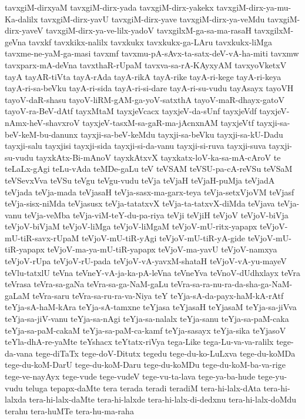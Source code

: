 {tavxgiM-dirxyaM
tavxgiM-dirx-yada
tavxgiM-dirx-yakekx
tavxgiM-dirx-ya-mu-Ka-dalilx
tavxgiM-dirx-yavU
tavxgiM-dirx-yave
tavxgiM-dirx-ya-veMdu
tavxgiM-dirx-yaveV
tavxgiM-dirx-ya-ve-lilx-yadoV
tavxgilxM-ga-sa-ma-rasaH
tavxgilxM-geVna
tavxkf
tavxkikx-nalilx
tavxkukx
tavxkukx-ga-LAru
tavxkukx-liMga
tavxme-ne-yaM-ga-masi
tavxmf
tavxmu-pA-sAvx-ta-satx-deV-vA-ha-miti
tavxmw
tavxparx-mA-deVna
tavxthaR-rUpaM
tavxva-sa-rA-KAyxyAM
tavxyoVketxV
tayA
tayAR-tiVta
tayA-rAda
tayA-rikA
tayA-rike
tayA-ri-kege
tayA-ri-keya
tayA-ri-sa-beVku
tayA-ri-sida
tayA-ri-si-dare
tayA-ri-su-vudu
tayAsayx
tayoVH
tayoV-daR-shasu
tayoV-liRM-gAM-ga-yoV-satxthA
tayoV-maR-dhayx-gatoV
tayoV-ra-BeV-dAtf
tayxMtaM
tayxjeVcacx
tayxjeV-da-sUnf
tayxjeVdf
tayxjeV-nAmx-heV-shavxroV
tayxjeV-tasxM-sa-gaR-ma-jAcnxnAM
tayxjeVtf
tayxji-sa-beV-keM-bu-danunx
tayxji-sa-beV-keMdu
tayxji-sa-beVku
tayxji-sa-kU-Dadu
tayxji-salu
tayxjisi
tayxji-sida
tayxji-si-da-vanu
tayxji-si-ruva
tayxji-suva
tayxji-su-vudu
tayxkAtx-Bi-mAnoV
tayxkAtxvX
tayxkatx-loV-ka-sa-mA-cAroV
te
teLaLx-gAgi
teLu-vAda
teMDe-gaLu
teV
teVSAM
teVSU-pa-cA-reVSu
teVSaM
teVSevxVva
teVSu
teVgu
teVgu-vudu
teVja
teVjaH
teVjaH-puMja
teVjadA
teVjada
teVja-mada
teVjasaH
teVja-sasx-ma-garx-teya
teVja-setxVjoVM
teVjasf
teVja-sisx-niMda
teVjasusx
teVja-tatatxvX
teVja-ta-tatxvX-diMda
teVjava
teVja-vanu
teVja-veMba
teVja-viM-teY-du-pa-riya
teVji
teVjiH
teVjoV
teVjoV-biVja
teVjoV-biVjaM
teVjoV-liMga
teVjoV-liMgaM
teVjoV-mU-ritx-yapapx
teVjoV-mU-tiR-savx-rUpaM
teVjoV-mU-tiR-yAgi
teVjoV-mU-tiR-yA-gide
teVjoV-mU-tiR-yapapx
teVjoV-ma-ya-mU-tiR-yapapx
teVjoV-ma-yavU
teVjoV-namxya
teVjoV-rUpa
teVjoV-rU-pada
teVjoV-vA-yavxM-shataH
teVjoV-vA-yu-mayeV
teVlu-tatxlU
teVna
teVneY-vA-ja-ka-pA-leVna
teVneYva
teVnoV-dUdhxlayx
teVra
teVrasa
teVra-sa-gaNa
teVra-sa-ga-NaM-gaLu
teVra-sa-ra-nu-ra-da-sha-ga-NaM-gaLaM
teVra-saru
teVra-sa-ru-ra-va-Niya
teY
teYja-sA-da-payx-haM-kA-rAtf
teYja-sA-haM-kAra
teYja-sA-tamxne
teYjasa
teYjasaH
teYjasaM
teYja-sa-jiVva
teYja-sa-jiV-vanu
teYja-sa-nAgi
teYja-sa-nalalx
teYja-sanu
teYja-sa-paM-caka
teYja-sa-paM-cakaM
teYja-sa-paM-ca-kamf
teYja-sasayx
teYja-sika
teYjasoV
teYla-dhA-re-yaMte
teYshacx
teYtatx-riVya
tega-Like
tega-Lu-va-va-ralilx
tege-da-vana
tege-diTaTx
tege-doV-Ditutx
tegedu
tege-du-ko-LuLxva
tege-du-koMDa
tege-du-koM-DarU
tege-du-koM-Daru
tege-du-koMDu
tege-du-koM-ba-va-rige
tege-ve-nayAyx
tege-vude
tege-vudeV
tege-vu-ta-lava
tege-ya-ba-hude
tege-yu-vudu
teluga
tepapx-daMte
tera
terada
teradi
teradiM
tera-hi-lalx-dAta
tera-hi-lalxda
tera-hi-lalx-daMte
tera-hi-lalxde
tera-hi-lalx-di-dedxnu
tera-hi-lalx-doMdu
terahu
tera-huMTe
tera-hu-ma-raha
}
